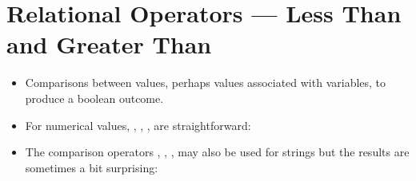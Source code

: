 \documentclass[letterpaper,10pt,english]{sphinxmanual}
\begin{document}
\section{Relational Operators — Less Than and Greater Than}
\label{\detokenize{lecture_notes/lec06_conditionals1:relational-operators-less-than-and-greater-than}}\begin{itemize}
\item {} 
Comparisons between values, perhaps values associated with variables,
to produce a boolean outcome.

\item {} 
For numerical values, \sphinxcode{\sphinxupquote{\textless{}}}, \sphinxcode{\sphinxupquote{\textless{}=}}, \sphinxcode{\sphinxupquote{\textgreater{}}}, \sphinxcode{\sphinxupquote{\textgreater{}=}} are
straightforward:

\begin{sphinxVerbatim}[commandchars=\\\{\}]
  
  
  
  
  
  
\end{sphinxVerbatim}

\item {} 
The comparison operators \sphinxcode{\sphinxupquote{\textless{}}}, \sphinxcode{\sphinxupquote{\textless{}=}}, \sphinxcode{\sphinxupquote{\textgreater{}}},
\sphinxcode{\sphinxupquote{\textgreater{}=}} may also be used for strings but the results are sometimes a
bit surprising:

\begin{sphinxVerbatim}[commandchars=\\\{\}]
  
  
  
  
  
  
  
  
\end{sphinxVerbatim}


\end{itemize}
\end{document}
